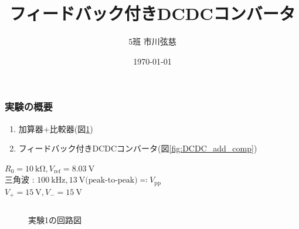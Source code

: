 \documentclass[mathsans]{beamer} %
\title{フィードバック付きDCDCコンバータ}
\author{5班 市川弦慈}
\date{\today}
\newcommand{\SIs}[2]{\SI[per-mode=symbol]{#1}{#2}}
\begin{document}
\begin{frame}
	\maketitle
\end{frame}
\begin{frame}
	\frametitle{実験の概要}

	\begin{enumerate}[実験\arabic*.]
		\item 加算器+比較器(図\ref{fig:add_comp})
		\item フィードバック付きDCDCコンバータ(図\ref{fig:DCDC_add_comp})
	\end{enumerate}
	$R_0=\SIs{10}{\kilo\ohm},V_\mathrm{ref}=\SIs{8.03}{\volt}$ \\
	三角波 : $\SIs{100}{\kilo\hertz}, \SIs{13}{\volt}\text{(peak-to-peak)}\eqcolon V_\mathrm{pp}$\\
	$V_+=\SIs{15}{\volt},V_-=\SIs{15}{\volt}$
	\begin{columns}
		\begin{column}{.45\linewidth}
			\begin{figure}[htbp]
				\begin{center}
					\caption{実験1の回路図}\label{fig:add_comp}
				\end{center}
			\end{figure}
		\end{column}
		\begin{column}{.45\linewidth}
			\begin{figure}[htbp]
				\begin{center}

\end{center}
\end{figure}
\end{column}
\end{columns}
\end{frame}
\end{document}
